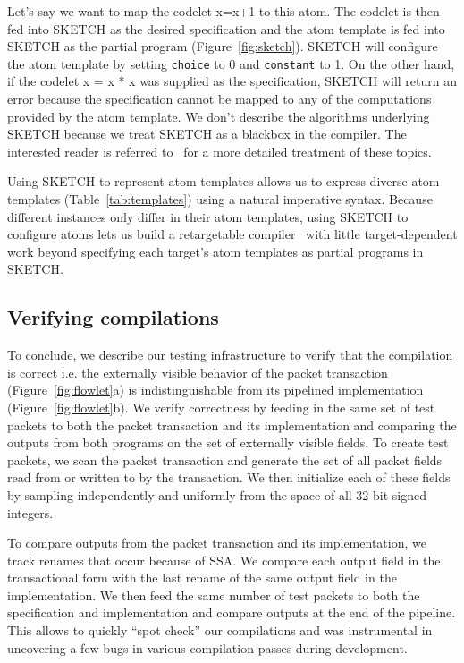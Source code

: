Let's say we want to map the codelet x=x+1 to this atom. The codelet is then
fed into SKETCH as the desired specification and the atom template is fed into
SKETCH as the partial program (Figure~\ref{fig:sketch}). SKETCH will configure
the atom template by setting \texttt{choice} to 0 and \texttt{constant} to 1.
On the other hand, if the codelet x = x * x was supplied as the specification,
SKETCH will return an error because the specification cannot be mapped to any
of the computations provided by the atom template. We don't describe the
algorithms underlying SKETCH because we treat SKETCH as a blackbox in the
\pktlanguage compiler. The interested reader is referred to~\cite{bitstreaming,
sketch_asplos} for a more detailed treatment of these topics.

Using SKETCH to represent atom templates allows us to express diverse atom
templates (Table~\ref{tab:templates}) using a natural imperative syntax.
Because different \absmachine instances only differ in their atom templates,
using SKETCH to configure atoms lets us build a retargetable
compiler~\cite{lcc} with little target-dependent work beyond specifying each
target's atom templates as partial programs in SKETCH.

\subsection{Verifying compilations}
\label{ss:verification}

To conclude, we describe our testing infrastructure to verify that the
compilation is correct i.e. the externally visible behavior of the packet
transaction (Figure~\ref{fig:flowlet}a) is indistinguishable from its pipelined
implementation (Figure~\ref{fig:flowlet}b). We verify correctness by feeding in
the same set of test packets to both the packet transaction and its
implementation and comparing the outputs from both programs on the set of
externally visible fields. To create test packets, we scan the packet
transaction and generate the set of all packet fields read from or written to
by the transaction. We then initialize each of these fields by sampling
independently and uniformly from the space of all 32-bit signed integers.

To compare outputs from the packet transaction and its implementation, we track
renames that occur because of SSA. We compare each output field in the
transactional form with the last rename of the same output field in the
implementation. We then feed the same number of test packets to both the
specification and implementation and compare outputs at the end of the
pipeline. This allows to quickly ``spot check'' our compilations and was
instrumental in uncovering a few bugs in various compilation passes during
development.
